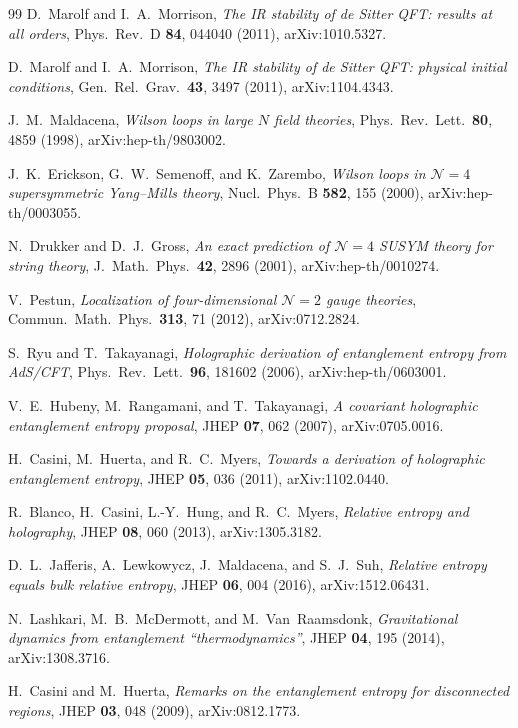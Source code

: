 \documentclass[
  aps,
  prd,
  preprint,
  groupedaddress,
  nofootinbib,
  longbibliography
]{revtex4-2}
\theoremstyle{remark}
\newcommand{\N}{\mathcal{N}}
\begin{document}
\begin{thebibliography}{99}
D.~Marolf and I.~A.~Morrison,
\textit{The IR stability of de Sitter QFT: results at all orders},
Phys.\ Rev.\ D \textbf{84}, 044040 (2011),
arXiv:1010.5327.

D.~Marolf and I.~A.~Morrison,
\textit{The IR stability of de Sitter QFT: physical initial conditions},
Gen.\ Rel.\ Grav.\ \textbf{43}, 3497 (2011),
arXiv:1104.4343.

J.~M.~Maldacena,
\textit{Wilson loops in large $N$ field theories},
Phys.\ Rev.\ Lett.\ \textbf{80}, 4859 (1998),
arXiv:hep-th/9803002.

J.~K.~Erickson, G.~W.~Semenoff, and K.~Zarembo,
\textit{Wilson loops in $\N=4$ supersymmetric Yang--Mills theory},
Nucl.\ Phys.\ B \textbf{582}, 155 (2000),
arXiv:hep-th/0003055.

N.~Drukker and D.~J.~Gross,
\textit{An exact prediction of $\N=4$ SUSYM theory for string theory},
J.\ Math.\ Phys.\ \textbf{42}, 2896 (2001),
arXiv:hep-th/0010274.

V.~Pestun,
\textit{Localization of four-dimensional $\N=2$ gauge theories},
Commun.\ Math.\ Phys.\ \textbf{313}, 71 (2012),
arXiv:0712.2824.

S.~Ryu and T.~Takayanagi,
\textit{Holographic derivation of entanglement entropy from AdS/CFT},
Phys.\ Rev.\ Lett.\ \textbf{96}, 181602 (2006),
arXiv:hep-th/0603001.

V.~E.~Hubeny, M.~Rangamani, and T.~Takayanagi,
\textit{A covariant holographic entanglement entropy proposal},
JHEP \textbf{07}, 062 (2007),
arXiv:0705.0016.

H.~Casini, M.~Huerta, and R.~C.~Myers,
\textit{Towards a derivation of holographic entanglement entropy},
JHEP \textbf{05}, 036 (2011),
arXiv:1102.0440.

R.~Blanco, H.~Casini, L.-Y.~Hung, and R.~C.~Myers,
\textit{Relative entropy and holography},
JHEP \textbf{08}, 060 (2013),
arXiv:1305.3182.

D.~L.~Jafferis, A.~Lewkowycz, J.~Maldacena, and S.~J.~Suh,
\textit{Relative entropy equals bulk relative entropy},
JHEP \textbf{06}, 004 (2016),
arXiv:1512.06431.

N.~Lashkari, M.~B.~McDermott, and M.~Van~Raamsdonk,
\textit{Gravitational dynamics from entanglement ``thermodynamics''},
JHEP \textbf{04}, 195 (2014),
arXiv:1308.3716.

H.~Casini and M.~Huerta,
\textit{Remarks on the entanglement entropy for disconnected regions},
JHEP \textbf{03}, 048 (2009),
arXiv:0812.1773.


\end{thebibliography}
\end{document}
